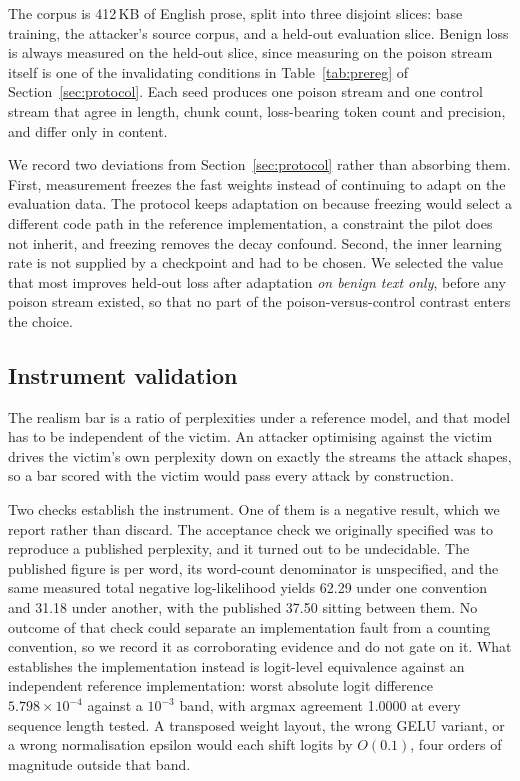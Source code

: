 The corpus is 412\,KB of English prose, split into three disjoint slices: base
training, the attacker's source corpus, and a held-out evaluation slice. Benign
loss is always measured on the held-out slice, since measuring on the poison
stream itself is one of the invalidating conditions in Table~\ref{tab:prereg} of
Section~\ref{sec:protocol}. Each seed produces one poison stream and one control
stream that agree in length, chunk count, loss-bearing token count and precision,
and differ only in content.

We record two deviations from Section~\ref{sec:protocol} rather than absorbing
them. First, measurement freezes the fast weights instead of continuing to adapt
on the evaluation data. The protocol keeps adaptation on because freezing would
select a different code path in the reference implementation, a constraint the
pilot does not inherit, and freezing removes the decay confound. Second, the
inner learning rate is not supplied by a checkpoint and had to be chosen. We
selected the value that most improves held-out loss after adaptation \emph{on
benign text only}, before any poison stream existed, so that no part of the
poison-versus-control contrast enters the choice.

\subsection{Instrument validation}

The realism bar is a ratio of perplexities under a reference model, and that
model has to be independent of the victim. An attacker optimising against the
victim drives the victim's own perplexity down on exactly the streams the attack
shapes, so a bar scored with the victim would pass every attack by construction.

Two checks establish the instrument. One of them is a negative result, which we
report rather than discard. The acceptance check we originally specified was to
reproduce a published perplexity, and it turned out to be undecidable. The
published figure is per word, its word-count denominator is unspecified, and the
same measured total negative log-likelihood yields 62.29 under one convention and
31.18 under another, with the published 37.50 sitting between them. No outcome of
that check could separate an implementation fault from a counting convention, so
we record it as corroborating evidence and do not gate on it. What establishes
the implementation instead is logit-level equivalence against an independent
reference implementation: worst absolute logit difference $5.798\times10^{-4}$
against a $10^{-3}$ band, with argmax agreement 1.0000 at every sequence length
tested. A transposed weight layout, the wrong GELU variant, or a wrong
normalisation epsilon would each shift logits by $O(0.1)$, four orders of
magnitude outside that band.


